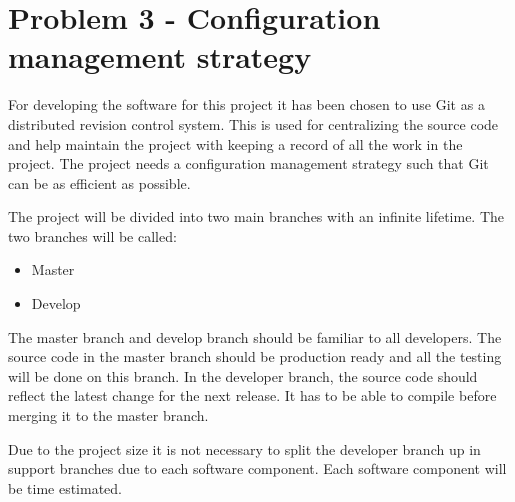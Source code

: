 \chapter{Problem 3 - Configuration management strategy}
For developing the software for this project it has been chosen to use Git as a distributed revision control system.
This is used for centralizing the source code and help maintain the project with keeping a record of all the work in the project.
The project needs a configuration management strategy such that Git can be as efficient as possible.

The project will be divided into two main branches with an infinite lifetime. The two branches will be called:
\begin{itemize}  
	\item Master
	\item Develop
\end{itemize}
The master branch and develop branch should be familiar to all developers.
The source code in the master branch should be production ready and all the testing will be done on this branch. In the developer branch, the source code should reflect the latest change for the next release.  It has to be able to compile before merging it to the master branch.

Due to the project size it is not necessary to split the developer branch up in support branches due to each software component.
Each software component will be time estimated.